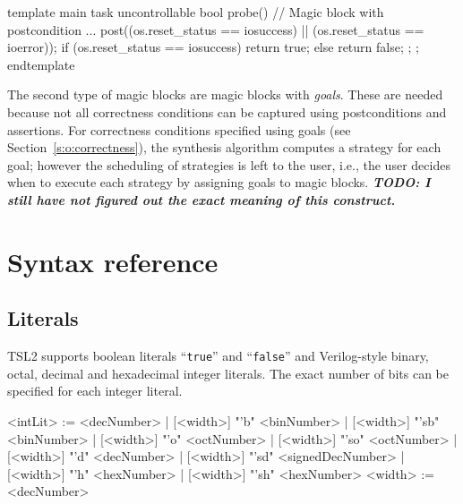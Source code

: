 \documentclass{report}
\newcommand{\src}[1]{\texttt{#1}}
\newcommand{\tsl}{TSL2 }
\newcommand{\comment}[1]{{\textit{\textbf{#1}}}}
\begin{document}

\begin{tsllisting}{}
template main
  task uncontrollable bool probe() {
    // Magic block with postcondition
    {...} post((os.reset_status == iosuccess) ||
               (os.reset_status == ioerror));
    if (os.reset_status == iosuccess) {
      return true;
    } else {
      return false;
    };
};
endtemplate
\end{tsllisting}

The second type of magic blocks are magic blocks with 
\emph{goals}.  These are needed because not all correctness 
conditions can be captured using postconditions and assertions.  
For correctness conditions specified using goals (see 
Section~\ref{s:o:correctness}), the synthesis algorithm computes a 
strategy for each goal; however the scheduling of strategies is 
left to the user, i.e., the user decides when to execute each 
strategy by assigning goals to magic blocks. \comment{TODO: I 
still have not figured out the exact meaning of this construct.}


\chapter{Syntax reference}

\section{Literals}\label{s:r:literals}

\tsl supports boolean literals ``\src{true}'' and ``\src{false}'' 
and Verilog-style binary, octal, decimal and hexadecimal integer 
literals.  The exact number of bits can be specified for each 
integer literal.  

\begin{bnflisting}{}
<intLit> := <decNumber>
          | [<width>] "'b"  <binNumber>
          | [<width>] "'sb" <binNumber>
          | [<width>] "'o"  <octNumber>
          | [<width>] "'so" <octNumber>
          | [<width>] "'d"  <decNumber>
          | [<width>] "'sd" <signedDecNumber>
          | [<width>] "'h"  <hexNumber>
          | [<width>] "'sh" <hexNumber>
<width> := <decNumber>
\end{bnflisting}
\end{document}

